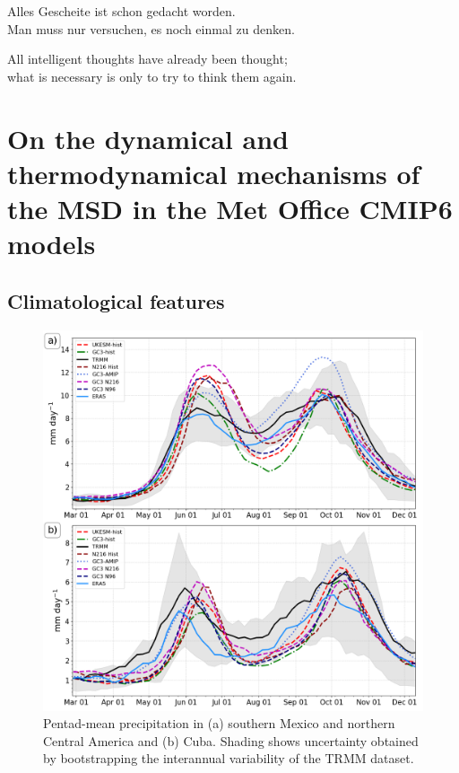 \begin{savequote}[8cm]
Alles Gescheite ist schon gedacht worden.\\
Man muss nur versuchen, es noch einmal zu denken.

All intelligent thoughts have already been thought;\\
what is necessary is only to try to think them again.
\end{savequote}

\chapter{\label{ch:2-litreview}On the dynamical and thermodynamical mechanisms of the MSD in the Met Office CMIP6 models}

\minitoc


\section{Climatological features}
\label{sq:msdclim}
 \begin{figure}[t!]
\includegraphics[width=\linewidth]{figures/pmean_f2.png}
\caption{Pentad-mean precipitation in (a) southern Mexico and northern Central America and (b) Cuba. Shading shows uncertainty obtained by bootstrapping the interannual variability of the TRMM dataset. }
\label{fig:msdcaribb}
\end{figure}

